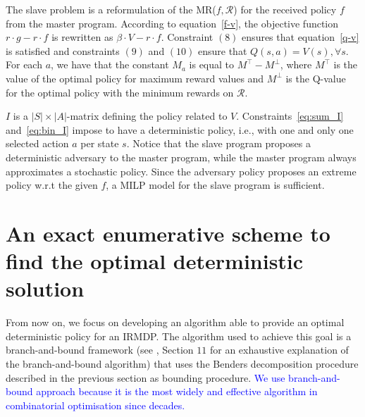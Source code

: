 \documentclass[sigconf]{aamas}  %
\newcommand{\ET}[1]{{\textcolor{blue}{#1}}}
\begin{document}
The slave problem is a reformulation of the MR($f, \mathcal{R}$) for the received policy $f$ from the master program. According to equation~\eqref{f-v}, the objective function $r \cdot g - r \cdot f$ is rewritten as $\beta \cdot V - r \cdot f$. 
% 
Constraint $(8)$ ensures that equation~\eqref{q-v} is satisfied and 
%
constraints $(9)$ and $(10)$ ensure that $Q(s, a) = V(s), \forall s $.
For each $a$, we have that the constant $M_a$ is equal to  $M^{\top} - M^{\perp}$, where  $M^{\top}$ is the value of the optimal policy for maximum reward values 
and $M^{\perp}$ is the Q-value for the optimal policy with the minimum rewards on $\mathcal{R}$. 

$I$ is a $|S|\times|A|$-matrix defining the policy related to $V$. 
Constraints~\eqref{eq:sum_I} and~\eqref{eq:bin_I} impose to  have a deterministic policy, i.e., with one and only one selected action $a$ per state $s$. Notice that the slave program proposes a deterministic adversary to the master program, while the master program always approximates a stochastic policy. Since the adversary policy proposes an extreme policy w.r.t the given $f$, a MILP model for the slave program is sufficient.   


\section{An exact enumerative scheme to find the optimal deterministic solution}\label{sec:bb} 

From now on, we focus on developing an algorithm able to provide an optimal deterministic policy for an IRMDP.
The algorithm used to achieve this goal is a branch-and-bound framework (see \cite{bertsimas2005optimization}, Section $11$ for an exhaustive explanation of the branch-and-bound algorithm) that uses the Benders decomposition procedure described in the previous section as bounding procedure. \ET{We use branch-and-bound approach because it is the most widely and effective algorithm in combinatorial optimisation since decades.} %
\end{document}
